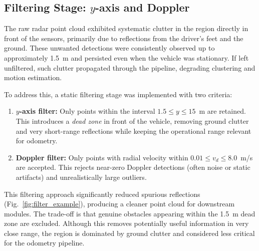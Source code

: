 \vspace{0.5em}
\subsection{Filtering Stage: $y$-axis and Doppler}

The raw radar point cloud exhibited systematic clutter in the region directly in front of the sensors, primarily due to reflections from the driver's feet and the ground.  
These unwanted detections were consistently observed up to approximately \SI{1.5}{\meter} and persisted even when the vehicle was stationary.  
If left unfiltered, such clutter propagated through the pipeline, degrading clustering and motion estimation.  

To address this, a static filtering stage was implemented with two criteria:
\begin{enumerate}
    \item \textbf{$y$-axis filter:} Only points within the interval $1.5 \leq y \leq 15$~m are retained.  
    This introduces a \textit{dead zone} in front of the vehicle, removing ground clutter and very short-range reflections while keeping the operational range relevant for odometry.
    \item \textbf{Doppler filter:} Only points with radial velocity within $0.01 \leq v_d \leq 8.0$~m/s are accepted.  
    This rejects near-zero Doppler detections (often noise or static artifacts) and unrealistically large outliers.
\end{enumerate}

\noindent
This filtering approach significantly reduced spurious reflections (Fig.~\ref{fig:filter_example}), producing a cleaner point cloud for downstream modules.  
The trade-off is that genuine obstacles appearing within the \SI{1.5}{\meter} dead zone are excluded.  
Although this removes potentially useful information in very close range, the region is dominated by ground clutter and considered less critical for the odometry pipeline.  

